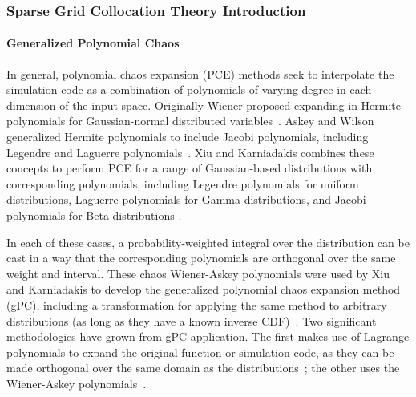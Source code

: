 \subsubsection{Sparse Grid Collocation Theory Introduction}
\label{subsub:SGctheory}
\paragraph{Generalized Polynomial Chaos}
In general, polynomial chaos expansion (PCE) methods seek to interpolate the simulation code as a combination of
polynomials of varying degree in each dimension of the input space.  Originally Wiener
proposed expanding in Hermite polynomials for Gaussian-normal distributed variables~\cite{wiener}.  Askey and
Wilson generalized Hermite polynomials to include Jacobi polynomials, including Legendre and Laguerre
polynomials~\cite{Wiener-Askey}.  Xiu and Karniadakis combines these concepts to perform PCE for a range of Gaussian-based
distributions with corresponding polynomials,
including Legendre polynomials for uniform distributions, Laguerre polynomials for Gamma distributions, and
Jacobi polynomials for Beta distributions \cite{xiu}.

In each of these cases, a probability-weighted
integral over the distribution can be cast in a way that the corresponding polynomials are orthogonal over the
same weight and interval.  These chaos Wiener-Askey polynomials were used by Xiu and Karniadakis to develop
the generalized polynomial chaos expansion method (gPC), including a transformation for applying the same
method to arbitrary distributions (as long as they have a known inverse CDF)~\cite{xiu}.  Two significant
methodologies have grown from gPC application.  The first makes use of Lagrange polynomials to expand the
original function or simulation code, as they can be made orthogonal over the same domain as the
distributions~\cite{SCLagrange}; the other uses the Wiener-Askey polynomials~\cite{xiu}.

